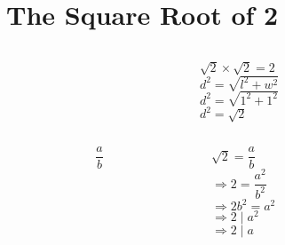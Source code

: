 \section{The Square Root of 2}

\begin{frame}
  \begin{columns}
    \begin{column}{0.3\textwidth}
      \centering
    \end{column}
    {\color{gmitgrey!30}\vrule{}} \hspace{0.1\textwidth}
    \begin{column}{0.5\textwidth}
      $\sqrt{2} \times \sqrt{2} = 2$ \\[8mm]
      $d^2 = \sqrt{l^2 + w^2}$ \\[8mm]
      $d^2 = \sqrt{1^2 + 1^2}$ \\[8mm]
      $d^2 = \sqrt{2}$ \\[8mm]
    \end{column}
  \end{columns}
\end{frame}


\begin{frame}
  \begin{columns}
    \begin{column}{0.3\textwidth}
      \color{gmitblue} \fontsize{30}{10}
      \[\frac{a}{b}\]
    \end{column}
    {\color{gmitgrey!30}\vrule{}} \hspace{0.1\textwidth}
    \begin{column}{0.5\textwidth}
      $\sqrt{2} = \dfrac{a}{b}$ \\[8mm]
      $\Rightarrow 2 = \dfrac{a^2}{b^2}$ \\[8mm]
      $\Rightarrow 2b^2 = a^2$ \\[8mm]
      $\Rightarrow 2 \mid a^2$ \\[8mm]
      $\Rightarrow 2 \mid a$
    \end{column}
  \end{columns}
\end{frame}


